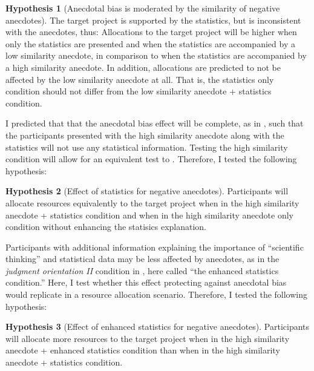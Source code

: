 \documentclass[a4paper, nobind, dvipsnames]{templates/ociamthesis}
\theoremstyle{definition}
\theoremstyle{definition}
\theoremstyle{definition}
\theoremstyle{definition}
\newtheorem{hypothesis}{Hypothesis}[chapter]
\theoremstyle{remark}
\begin{document}
\begin{hypothesis}[Anecdotal bias is moderated by the similarity of negative anecdotes]
\protect\hypertarget{hyp:anecdote-similarity-anecdotes-1}{}{\label{hyp:anecdote-similarity-anecdotes-1} {} }The target project is supported by the statistics, but is inconsistent with the
anecdotes, thus: Allocations to the target project will be higher when only the
statistics are presented and when the statistics are accompanied by a low
similarity anecdote, in comparison to when the statistics are accompanied by a
high similarity anecdote. In addition, allocations are predicted to not be
affected by the low similarity anecdote at all. That is, the statistics only
condition should not differ from the low similarity anecdote + statistics
condition.
\end{hypothesis}

I predicted that that the anecdotal bias effect will be complete, as in
\textcite{wainberg2013}, such that the participants presented with the high similarity
anecdote along with the statistics will not use any statistical information.
Testing the high similarity condition will allow for an equivalent test to
\textcite{wainberg2013}. Therefore, I tested the following hypothesis:

\begin{hypothesis}[Effect of statistics for negative anecdotes]
\protect\hypertarget{hyp:statistics-anecdotes-1}{}{\label{hyp:statistics-anecdotes-1} {} }Participants will allocate resources equivalently to the target project when in
the high similarity anecdote + statistics condition and when in the high
similarity anecdote only condition without enhancing the statisics explanation.
\end{hypothesis}

Participants with additional information explaining the importance of
``scientific thinking'' and statistical data may be less affected by anecdotes, as
in the \emph{judgment orientation II} condition in \textcite{wainberg2018}, here called ``the
enhanced statistics condition.'' Here, I test whether this effect protecting
against anecdotal bias would replicate in a resource allocation scenario.
Therefore, I tested the following hypothesis:

\begin{hypothesis}[Effect of enhanced statistics for negative anecdotes]
\protect\hypertarget{hyp:enhanced-statistics-anecdotes-1}{}{\label{hyp:enhanced-statistics-anecdotes-1} {} }Participants will allocate more resources to the target project when in the high
similarity anecdote + enhanced statistics condition than when in the high
similarity anecdote + statistics condition.
\end{hypothesis}
\end{document}
